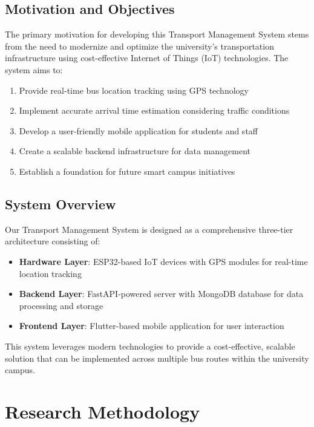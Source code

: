 \documentclass[12pt,a4paper]{article}
\begin{document}
\subsection{Motivation and Objectives}

The primary motivation for developing this Transport Management System stems from the need to modernize and optimize the university's transportation infrastructure using cost-effective Internet of Things (IoT) technologies. The system aims to:

\begin{enumerate}
    \item Provide real-time bus location tracking using GPS technology
    \item Implement accurate arrival time estimation considering traffic conditions
    \item Develop a user-friendly mobile application for students and staff
    \item Create a scalable backend infrastructure for data management
    \item Establish a foundation for future smart campus initiatives
\end{enumerate}

\subsection{System Overview}

Our Transport Management System is designed as a comprehensive three-tier architecture consisting of:

\begin{itemize}
    \item \textbf{Hardware Layer}: ESP32-based IoT devices with GPS modules for real-time location tracking
    \item \textbf{Backend Layer}: FastAPI-powered server with MongoDB database for data processing and storage
    \item \textbf{Frontend Layer}: Flutter-based mobile application for user interaction
\end{itemize}

This system leverages modern technologies to provide a cost-effective, scalable solution that can be implemented across multiple bus routes within the university campus.

\section{Research Methodology}
\end{document}
